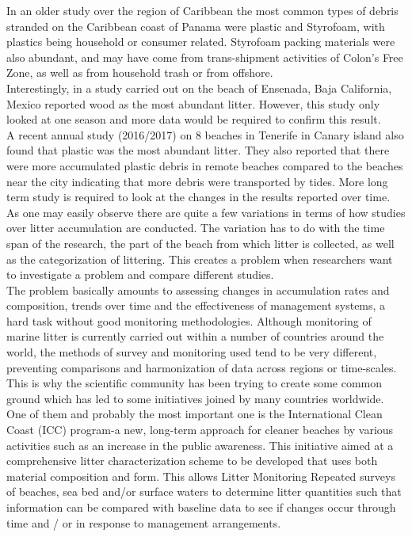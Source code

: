 \documentclass[10pt]{article}\usepackage[]{graphicx}\usepackage[]{color}
\begin{document}
In an older study over the region of Caribbean the most common types of debris stranded on the Caribbean coast of Panama were plastic and Styrofoam, with plastics being household or consumer related. Styrofoam packing materials were also abundant, and may have come from trans-shipment activities of Colon's Free Zone, as well as from household trash or from offshore. \cite{ GARRITY1993} \\

Interestingly, in a study carried out on the beach of Ensenada, Baja California, Mexico reported wood as the most abundant litter. \cite{SILVA2003} However, this study only looked at one season and more data would be required to confirm this result. \\

A recent annual study (2016/2017) on 8 beaches in Tenerife in Canary island also found that plastic was the most abundant litter. They also reported that there were more accumulated plastic debris in remote beaches compared to the beaches near the city indicating that more debris were transported by tides. More long term study is required to look at the changes in the results reported over time. \cite{REINOLD2020} \\

As one may easily observe there are quite a few variations in terms of how studies over litter accumulation are conducted. The variation has to do with the time span of the research, the part of the beach from which litter is collected, as well as the categorization of littering. This creates a problem when researchers want to investigate a problem and compare different studies. \\
The problem basically amounts to assessing changes in accumulation rates and composition, trends over time and the effectiveness of management systems, a hard task without good monitoring methodologies. Although monitoring of marine litter is currently carried out within a number of countries around the world, the methods of survey and monitoring used tend to be very different, preventing comparisons and harmonization of data across regions or time-scales.\\

This is why the scientific community has been trying to create some common ground which has led to some initiatives joined by many countries worldwide. One of them and probably the most important one is the International Clean Coast (ICC) program-a new, long-term approach for cleaner beaches by various activities such as an increase in the public awareness. \cite{ CHESHIRE2009} This initiative aimed at a comprehensive litter characterization scheme to be developed that uses both material composition and form. This allows Litter Monitoring Repeated surveys of beaches, sea bed and/or surface waters to determine litter quantities such that information can be compared with baseline data to see if changes occur through time and / or in response to management arrangements.
\end{document}
